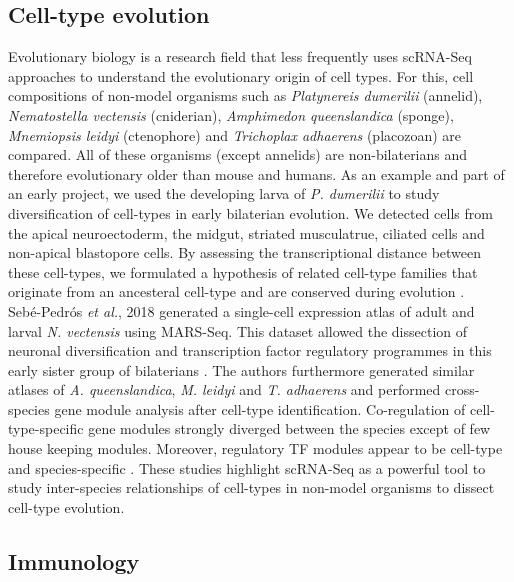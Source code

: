 \subsection{Cell-type evolution} 

Evolutionary biology is a research field that less frequently uses scRNA-Seq approaches to understand the evolutionary origin of cell types. For this, cell compositions of non-model organisms such as \textit{Platynereis dumerilii} (annelid), \textit{Nematostella vectensis} (cniderian), \textit{Amphimedon queenslandica} (sponge), \textit{Mnemiopsis leidyi} (ctenophore) and \textit{Trichoplax adhaerens} (placozoan) are compared. All of these organisms (except annelids) are non-bilaterians and therefore evolutionary older than mouse and humans. As an example and part of an early project, we used the developing larva of \textit{P. dumerilii} to study diversification of cell-types in early bilaterian evolution. We detected cells from the apical neuroectoderm, the midgut, striated musculatrue, ciliated cells and non-apical blastopore cells. By assessing the transcriptional distance between these cell-types, we formulated a hypothesis of related cell-type families that originate from an ancesteral cell-type and are conserved during evolution \citep{Achim2018}.  \\

Seb\'e{}-Pedr\'o{}s \emph{et al.}, 2018 generated a single-cell expression atlas of adult and larval \textit{N. vectensis} using MARS-Seq. This dataset allowed the dissection of neuronal diversification and transcription factor regulatory programmes in this early sister group of bilaterians \citep{Sebe-Pedros2018}. The authors furthermore generated similar atlases of \textit{A. queenslandica}, \textit{M. leidyi} and \textit{T. adhaerens} and performed cross-species gene module analysis after cell-type identification. Co-regulation of cell-type-specific gene modules strongly diverged between the species except of few house keeping modules. Moreover, regulatory TF modules appear to be cell-type and species-specific \citep{Sebe-Pedros2018a}. These studies highlight scRNA-Seq as a powerful tool to study inter-species relationships of cell-types in non-model organisms to dissect cell-type evolution. 

\subsection{Immunology}

